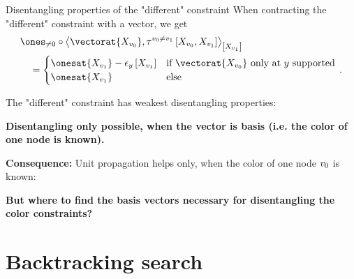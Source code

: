 \documentclass{beamer}
\begin{document}
    \begin{frame}{Disentangling properties of the "different" constraint}
        When contracting the "different" constraint with a vector, we get
        \begin{align*}
            &\nzcontractionof{
                \vectorat{\catvariableof{\nodeof{0}}},
                \hypercoreofat{\nodeof{0}\neq\nodeof{1}}{\catvariableof{\nodeof{0}},\catvariableof{\nodeof{1}}}
            }{\catvariableof{\nodeof{1}}} \\
            & \quad =
            \begin{cases}
                \onesat{\catvariableof{\nodeof{1}}} - \onehotmapofat{\headindex}{\catvariableof{\nodeof{1}}} & \text{if $\vectorat{\catvariableof{\nodeof{0}}}$ only at $\headindex$ supported} \\
                \onesat{\catvariableof{\nodeof{1}}} & \text{else}
            \end{cases} \, .
        \end{align*}


        The "different" constraint has weakest disentangling properties:
        \begin{center}
            \bf Disentangling only possible, when the vector is basis (i.e. the color of one node is known).
        \end{center}

            {\bf Consequence:} Unit propagation helps only, when the color of one node $v_{0}$ is known:
        \begin{center}
            \bf But where to find the basis vectors necessary for disentangling the color constraints?
        \end{center}
    \end{frame}


    \section{Backtracking search}
\end{document}
